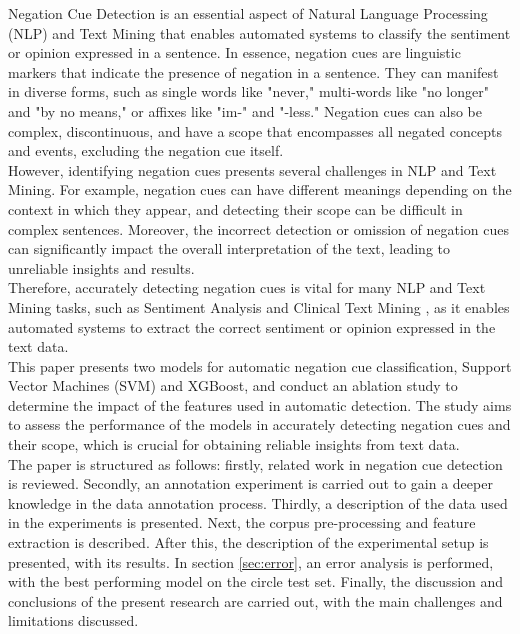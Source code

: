 Negation Cue Detection is an essential aspect of Natural Language Processing (NLP) and Text Mining that enables automated systems to classify the sentiment or opinion expressed in a sentence. In essence, negation cues are linguistic markers that indicate the presence of negation in a sentence. They can manifest in diverse forms, such as single words like "never," multi-words like "no longer" and "by no means," or affixes like "im-" and "-less." Negation cues can also be complex, discontinuous, and have a scope that encompasses all negated concepts and events, excluding the negation cue itself. \cite{jbara-2012}
\\

However, identifying negation cues presents several challenges in NLP and Text Mining. For example, negation cues can have different meanings depending on the context in which they appear, and detecting their scope can be difficult in complex sentences. Moreover, the incorrect detection or omission of negation cues can significantly impact the overall interpretation of the text, leading to unreliable insights and results.
\\

Therefore, accurately detecting negation cues is vital for many NLP and Text Mining tasks, such as Sentiment Analysis \cite{cruz2016machine} and Clinical Text Mining \cite{mehrabi2015deepen}, as it enables automated systems to extract the correct sentiment or opinion expressed in the text data. 
\\

This paper presents two models for automatic negation cue classification,  Support Vector Machines (SVM) and XGBoost, and conduct an ablation study to determine the impact of the features used in automatic detection. The study aims to assess the performance of the models in accurately detecting negation cues and their scope, which is crucial for obtaining reliable insights from text data.
\\

 The paper is structured as follows: firstly, related work in negation cue detection is reviewed. Secondly, an annotation experiment is carried out to gain a deeper knowledge in the data annotation process. Thirdly, a description of the data used in the experiments is presented. Next, the corpus pre-processing and feature extraction is described. After this, the description of the experimental setup is presented, with its results. In section \ref{sec:error}, an error analysis is performed, with the best performing model on the circle test set. Finally, the discussion and conclusions of the present research are carried out, with the main challenges and limitations discussed.

